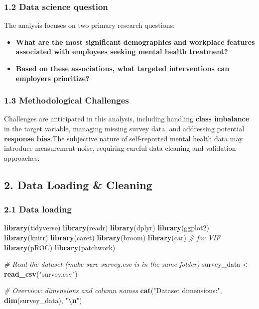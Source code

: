 \documentclass[
]{article}
\newenvironment{Shaded}{\begin{snugshade}}{\end{snugshade}}
\newcommand{\CommentTok}[1]{\textcolor[rgb]{0.56,0.35,0.01}{\textit{#1}}}
\newcommand{\FunctionTok}[1]{\textcolor[rgb]{0.13,0.29,0.53}{\textbf{#1}}}
\newcommand{\NormalTok}[1]{#1}
\newcommand{\OtherTok}[1]{\textcolor[rgb]{0.56,0.35,0.01}{#1}}
\newcommand{\SpecialCharTok}[1]{\textcolor[rgb]{0.81,0.36,0.00}{\textbf{#1}}}
\newcommand{\StringTok}[1]{\textcolor[rgb]{0.31,0.60,0.02}{#1}}
\begin{document}
\subsubsection{1.2 Data science question}\label{data-science-question}

The analysis focuses on two primary research questions:

\begin{itemize}
\item
  \textbf{What are the most significant demographics and workplace
  features associated with employees seeking mental health treatment?}
\item
  \textbf{Based on these associations, what targeted interventions can
  employers prioritize?}
\end{itemize}

\subsubsection{1.3 Methodological
Challenges}\label{methodological-challenges}

Challenges are anticipated in this analysis, including handling
\textbf{class imbalance} in the target variable, managing missing survey
data, and addressing potential \textbf{response bias}.The subjective
nature of self-reported mental health data may introduce measurement
noise, requiring careful data cleaning and validation approaches.

\subsection{\texorpdfstring{\textbf{2. Data Loading \&
Cleaning}}{2. Data Loading \& Cleaning}}\label{data-loading-cleaning}

\subsubsection{2.1 Data loading}\label{data-loading}

\begin{Shaded}
\begin{Highlighting}[]
\FunctionTok{library}\NormalTok{(tidyverse)}
\FunctionTok{library}\NormalTok{(readr)}
\FunctionTok{library}\NormalTok{(dplyr)}
\FunctionTok{library}\NormalTok{(ggplot2)}
\FunctionTok{library}\NormalTok{(knitr)}
\FunctionTok{library}\NormalTok{(caret) }
\FunctionTok{library}\NormalTok{(broom) }
\FunctionTok{library}\NormalTok{(car)  }\CommentTok{\# for VIF}
\FunctionTok{library}\NormalTok{(pROC) }
\FunctionTok{library}\NormalTok{(patchwork)}

\CommentTok{\# Read the dataset (make sure \textquotesingle{}survey.csv\textquotesingle{} is in the same folder)}
\NormalTok{survey\_data }\OtherTok{\textless{}{-}} \FunctionTok{read\_csv}\NormalTok{(}\StringTok{"survey.csv"}\NormalTok{)}

\CommentTok{\# Overview: dimensions and column names}
\FunctionTok{cat}\NormalTok{(}\StringTok{"Dataset dimensions:"}\NormalTok{, }\FunctionTok{dim}\NormalTok{(survey\_data), }\StringTok{"}\SpecialCharTok{\textbackslash{}n}\StringTok{"}\NormalTok{)}
\end{Highlighting}
\end{Shaded}
\end{document}
